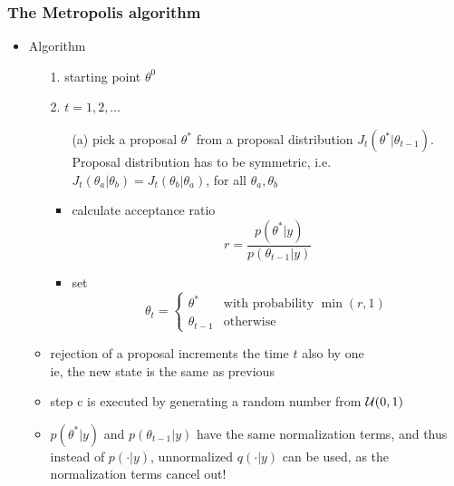 \documentclass[10pt]{beamer}
\begin{document}
\begin{frame}

\frametitle{The Metropolis algorithm}

  \begin{itemize}
  \item Algorithm
    \begin{itemize}
      \item[1.] starting point $\theta^0$
      \item[2.] $t=1,2,\ldots$
        \begin{itemize}
        \item[(a)] pick a proposal $\theta^{*}$ from a {\color{uured} proposal distribution}
          $J_t(\theta^{*}|\theta_{t-1})$. \\
          Proposal distribution has to be symmetric, i.e.\\
          $J_t(\theta_a|\theta_b)=J_t(\theta_b|\theta_a)$, for all
          $\theta_a,\theta_b$
        \item<2->[(b)] calculate acceptance ratio
          \begin{equation*}
            r=\frac{p(\theta^{*}|y)}{p(\theta_{t-1}|y)}
          \end{equation*}
          \vspace{-6mm}
        \item<3->[(c)] set
          \begin{equation*}
            \theta_t=
            \begin{cases}
              \theta^{*} & \text{with probability $\min(r,1)$}\\
              \theta_{t-1} & \text{otherwise}
            \end{cases}
          \end{equation*}
      \end{itemize}
      \vspace{-1.5\baselineskip}
    \item<5-> rejection of a proposal increments the time $t$ also by one\\
      ie, the new state is the same as previous
      \item<6-> step c is executed by generating a random number from
        $\mathcal{U}(0,1)$
      \item<7-> $p(\theta^*|y)$ and $p(\theta_{t-1}|y)$ have the same
        normalization terms, and thus instead of $p(\cdot|y)$,
        unnormalized $q(\cdot|y)$ can be used, { \color{uured} as the normalization terms cancel out}!
    \end{itemize}
  \end{itemize}

\end{frame}
\end{document}
